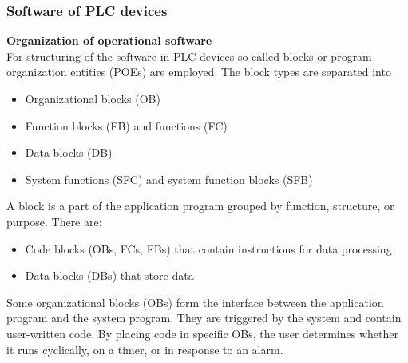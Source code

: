 \begin{frame}
	\frametitle{Software of PLC devices}
	\textbf{Organization of operational software}\\
	For structuring of the software in PLC devices so called blocks or program organization
	entities (POEs) are employed. 
	The block types are separated into
	\begin{itemize}
		\item  Organizational blocks (OB)
		\item Function blocks (FB) and functions (FC)
		\item Data blocks (DB)
		\item System functions (SFC) and system function blocks (SFB)
	\end{itemize}
	A block is a part of the application program grouped by function, structure, 
	or purpose. There are:
	\begin{itemize}
		\item Code blocks (OBs, FCs, FBs) that contain instructions for data processing
		\item Data blocks (DBs) that store data
	\end{itemize}
	Some organizational blocks (OBs) form the interface between the application program and 
	the system program. They are triggered by the system and contain user-written code. 
	By placing code in specific OBs, the user determines whether it runs cyclically, on a 
	timer, or in response to an alarm.
\end{frame}

